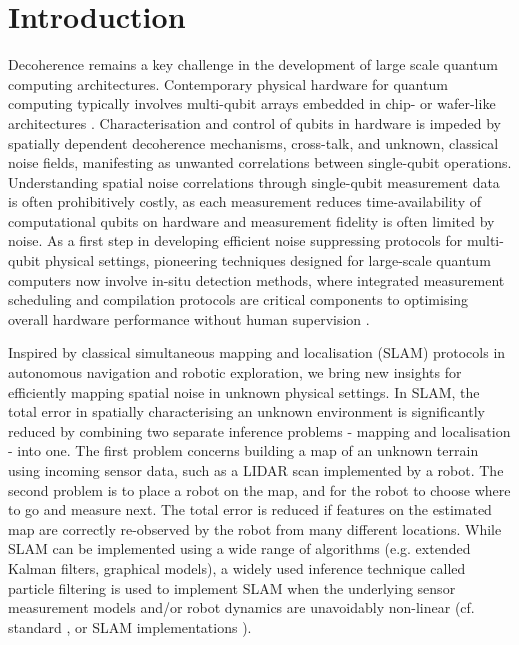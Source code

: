 \documentclass[reprint,longbibliography]{revtex4-1} %
\begin{document}

\section{Introduction}

Decoherence remains a key challenge in the development of large scale quantum computing architectures. Contemporary physical hardware for quantum computing typically involves multi-qubit arrays embedded in chip- or wafer-like architectures \cite{yao2012scalable,monroe2014large,veldhorst2017silicon,jones2012layered,kielpinski2002architecture,franke2019rent}. Characterisation and control of qubits in hardware is impeded by spatially dependent decoherence mechanisms, cross-talk, and unknown, classical noise fields,  \cite{postler2018experimental} manifesting as unwanted correlations between single-qubit operations. Understanding spatial noise correlations through single-qubit measurement data is often prohibitively costly, as each measurement reduces time-availability of computational qubits on hardware and measurement fidelity is often limited by noise. As a first step in developing efficient noise suppressing protocols for multi-qubit physical settings, pioneering techniques designed for large-scale quantum computers now involve in-situ detection methods, where integrated measurement scheduling and compilation protocols are critical components to optimising overall hardware performance without human supervision \cite{venturelli2018compiling,murali2019noise,shi2019optimized,venturelli2018optimization,tannu2018case}.


Inspired by classical simultaneous mapping and localisation (SLAM) protocols \cite{cadena2016past,bergman1999recursive,stachniss2014particle,durrant2006simultaneous,bailey2006simultaneous,murphy2000bayesian,howard2006multi,thrun2005probabilistic,thrun1998probabilistic}in autonomous navigation and robotic exploration, we bring new insights for efficiently mapping spatial noise in unknown physical settings. In SLAM, the total error in spatially characterising an unknown environment is significantly reduced by combining two separate inference problems - mapping and localisation - into one. The first problem concerns building a map of an unknown terrain using incoming sensor data, such as a LIDAR scan implemented by a robot. The second problem is to place a robot on the map, and for the robot to choose where to go and measure next. The total error is reduced if features on the estimated map are correctly re-observed by the robot from many different locations. While SLAM can be implemented using a wide range of algorithms (e.g. extended Kalman filters, graphical models), a widely used inference technique called particle filtering is used to implement SLAM when the underlying sensor measurement models and/or robot dynamics are unavoidably non-linear (cf. standard \cite{doucet2001introduction}, or SLAM implementations \cite{beevers2007fixed,grisettiyz2005improving,poterjoy2016localized}).
\end{document}

